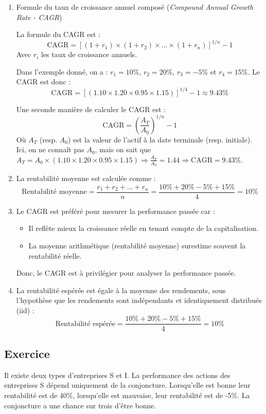 \documentclass[a4paper, 12pt]{report}
\begin{document}
\begin{enumerate}

\item Formule du taux de croissance annuel composé (\textit{Compound Annual Growth Rate - CAGR})

La formule du CAGR est :
\[
\text{CAGR} = \left[\left(1 + r_1\right) \times \left(1 + r_2\right) \times \dots \times \left(1 + r_n\right)\right]^{1/n} - 1
\]
Avec $r_i$ les taux de croissance annuels.

Dans l'exemple donné, on a : $r_1 = 10\%$, $r_2 = 20\%$, $r_3 = -5\%$ et $r_4 = 15\%$. Le CAGR est donc :
\[
\text{CAGR} = \left[(1.10 \times 1.20 \times 0.95 \times 1.15)\right]^{1/4} - 1 \approx 9.43\%
\]

Une seconde manière de calculer le CAGR est :
\[
\text{CAGR} = \left(\frac{A_T}{A_0}\right)^{1/n} - 1
\]
Où $A_T$ (resp. $A_0$) est la valeur de l'actif à la date terminale (resp. initiale). Ici, on ne connaît pas $A_0$, mais on sait que $A_T = A_0 \times (1.10 \times 1.20 \times 0.95 \times 1.15) \Rightarrow \frac{A_T}{A_0} = 1.44 \Rightarrow \text{CAGR} = 9.43\%$.

\item La rentabilité moyenne est calculée comme :
\[
\text{Rentabilité moyenne} = \frac{r_1 + r_2 + \dots + r_n}{n} = \frac{10\% + 20\% - 5\% + 15\%}{4} = 10\%
\]

\item Le CAGR est préféré pour mesurer la performance passée car :
\begin{itemize}
	\item Il reflète mieux la croissance réelle en tenant compte de la capitalisation.
	\item La moyenne arithmétique (rentabilité moyenne) surestime souvent la rentabilité réelle.
\end{itemize}
Donc, le CAGR est à privilégier pour analyser la performance passée.

\item La rentabilité espérée est égale à la moyenne des rendements, sous l'hypothèse que les rendements sont indépendants et identiquement distribués (iid) :
\[
\text{Rentabilité espérée} = \frac{10\% + 20\% - 5\% + 15\%}{4} = 10\%
\]
\end{enumerate}

\subsection{Exercice}
Il existe deux types d'entreprises S et I. La performance des actions des entreprises S dépend uniquement de la conjoncture. Lorsqu'elle est bonne leur rentabilité est de 40\%, lorsqu'elle est mauvaise, leur rentabilité est de -5\%. La conjoncture a une chance sur trois d'être bonne.
\end{document}
